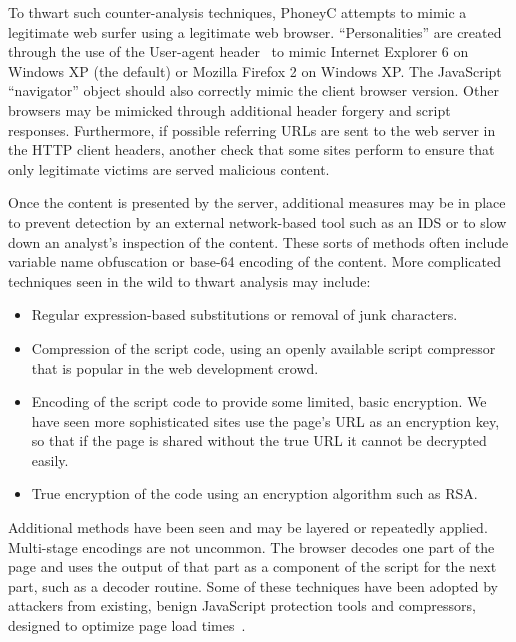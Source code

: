 \documentclass[10pt,twocolumn]{article}
\begin{document}
To thwart such counter-analysis techniques, PhoneyC attempts to mimic a legitimate web surfer using a legitimate web browser. ``Personalities'' are created through the use of the User-agent header~\cite{bernerslee:htp} to mimic Internet Explorer 6 on Windows XP (the default) or Mozilla Firefox 2 on Windows XP. The JavaScript ``navigator'' object should also correctly mimic the client browser version. Other browsers may be mimicked through additional header forgery and script responses. Furthermore, if possible referring URLs are sent to the web server in the HTTP client headers, another check that some sites perform to ensure that only legitimate victims are served malicious content.

Once the content is presented by the server, additional measures may be in place to prevent detection by an external network-based tool such as an IDS or to slow down an analyst's inspection of the content. These sorts of methods often include variable name obfuscation or base-64 encoding of the content. More complicated techniques seen in the wild to thwart analysis may include:
\begin{itemize}
\item{Regular expression-based substitutions or removal of junk characters.}
\item{Compression of the script code, using an openly available script compressor that is popular in the web development crowd.}
\item{Encoding of the script code to provide some limited, basic encryption. We have seen more sophisticated sites use the page's URL as an encryption key, so that if the page is shared without the true URL it cannot be decrypted easily.}
\item{True encryption of the code using an encryption algorithm such as RSA.}
\end{itemize}
Additional methods have been seen and may be layered or repeatedly applied. Multi-stage encodings are not uncommon. The browser decodes one part of the page and uses the output of that part as a component of the script for the next part, such as a decoder routine. Some of these techniques have been adopted by attackers from existing, benign JavaScript protection tools and compressors, designed to optimize page load times~\cite{packer20}. 

\end{document}
